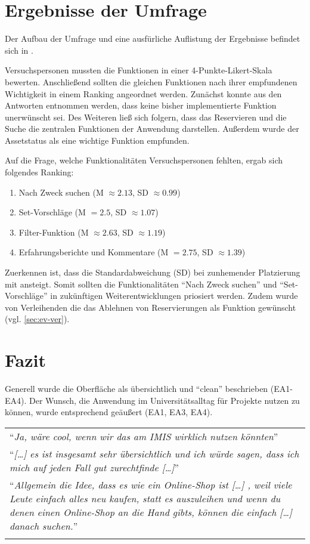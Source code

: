 \section{Ergebnisse der Umfrage}
Der Aufbau der Umfrage und eine ausfürliche Auflistung der Ergebnisse befindet sich in . 

Versuchspersonen mussten die Funktionen in einer 4-Punkte-Likert-Skala bewerten. Anschließend
sollten die gleichen Funktionen nach ihrer empfundenen Wichtigkeit in einem Ranking angeordnet
werden. Zunächst konnte aus den Antworten entnommen werden, dass keine bisher implementierte
Funktion unerwünscht sei. Des Weiteren ließ sich folgern, dass das Reservieren und die Suche die
zentralen Funktionen der Anwendung darstellen. Außerdem wurde der Assetstatus als eine wichtige
Funktion empfunden.  

Auf die Frage, welche Funktionalitäten Versuchspersonen fehlten, ergab sich folgendes Ranking:
\begin{enumerate}
  \item Nach Zweck suchen (M \(\approx 2.13\), SD \(\approx 0.99\))
  \item Set-Vorschläge (M \( = 2.5\), SD \(\approx 1.07\))
  \item Filter-Funktion (M \( \approx 2.63\), SD \(\approx 1.19\))
  \item Erfahrungsberichte und Kommentare (M \( = 2.75\), SD \(\approx 1.39\))
\end{enumerate}

Zuerkennen ist, dass die Standardabweichung (SD) bei zunhemender Platzierung mit ansteigt. Somit
sollten die Funktionalitäten \enquote{Nach Zweck suchen} und \enquote{Set-Vorschläge}  in
zukünftigen Weiterentwicklungen priosiert werden.  Zudem wurde von Verleihenden die das Ablehnen von
Reservierungen als Funktion gewünscht (vgl. \ref{sec:ev-ver}).


\section{Fazit}
Generell wurde die Oberfläche als übersichtlich und \enquote{clean} beschrieben
(EA1-EA4). Der Wunsch, die Anwendung im Universitätsalltag für Projekte
nutzen zu können, wurde entsprechend geäußert (EA1, EA3, EA4).

\begin{longtable}{p{}} \arrayrulecolor{maincolor}\hline
  \enquote{\textit{Ja, wäre cool, wenn wir das am IMIS wirklich nutzen
  könnten}}                                                      \\
  \enquote{\textit{[\dots] es ist insgesamt sehr übersichtlich und ich würde
  sagen, dass ich mich auf jeden Fall gut zurechtfinde [\dots]}} \\
  \enquote{\textit{Allgemein die Idee, dass es wie ein Online-Shop ist [\dots] ,
      weil viele Leute einfach alles neu kaufen, statt es auszuleihen und wenn du
      denen einen Online-Shop an die Hand gibts, können die einfach [\dots] danach
  suchen.}}                                                      \\
  \arrayrulecolor{maincolor}\hline
\end{longtable}

